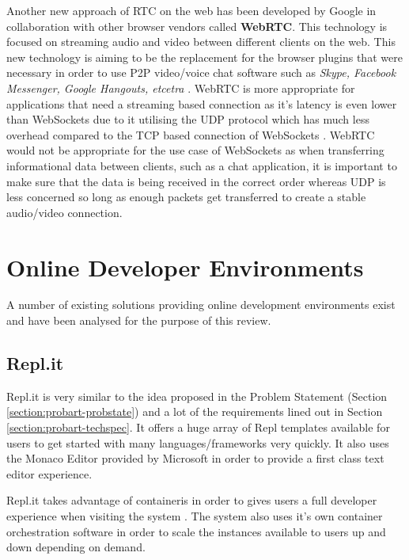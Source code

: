 Another new approach of RTC on the web has been developed by Google in collaboration with other browser vendors called \textbf{WebRTC}. This technology is focused on streaming audio and video between different clients on the web. This new technology is aiming to be the replacement for the browser plugins that were necessary in order to use P2P video/voice chat software such as \textit{Skype, Facebook Messenger, Google Hangouts, etcetra} \cite{webrtc}. WebRTC is more appropriate for applications that need a streaming based connection as it's latency is even lower than WebSockets due to it utilising the UDP protocol which has much less overhead compared to the TCP based connection of WebSockets \cite{udpvstcp}. WebRTC would not be appropriate for the use case of WebSockets as when transferring informational data between clients, such as a chat application, it is important to make sure that the data is being received in the correct order whereas UDP is less concerned so long as enough packets get transferred to create a stable audio/video connection.


\section{Online Developer Environments} \label{lit-ode}

A number of existing solutions providing online development environments exist and have been analysed for the purpose of this review.

\subsection{Repl.it}

Repl.it is very similar to the idea proposed in the Problem Statement (Section \ref{section:probart-probstate}) and a lot of the requirements lined out in Section \ref{section:probart-techspec}. It offers a huge array of Repl templates available for users to get started with many languages/frameworks very quickly. It also uses the Monaco Editor provided by Microsoft in order to provide a first class text editor experience.

Repl.it takes advantage of containeris in order to gives users a full developer experience when visiting the system \cite{replit-containers}. The system also uses it's own container orchestration software in order to scale the instances available to users up and down depending on demand.

